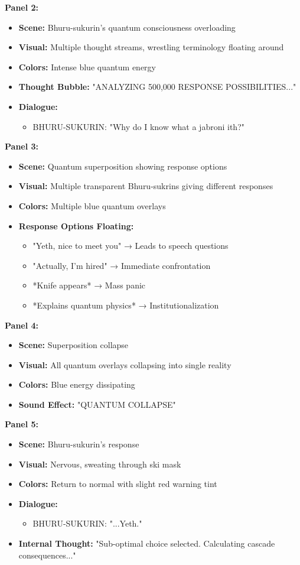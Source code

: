 \documentclass[12pt,a4paper]{article}
\begin{document}
\textbf{Panel 2:}
\begin{itemize}
\item \textbf{Scene:} Bhuru-sukurin's quantum consciousness overloading
\item \textbf{Visual:} Multiple thought streams, wrestling terminology floating around
\item \textbf{Colors:} Intense blue quantum energy
\item \textbf{Thought Bubble:} "ANALYZING 500,000 RESPONSE POSSIBILITIES..."
\item \textbf{Dialogue:}
\begin{itemize}
\item BHURU-SUKURIN: "Why do I know what a jabroni ith?"
\end{itemize}
\end{itemize}

\textbf{Panel 3:}
\begin{itemize}
\item \textbf{Scene:} Quantum superposition showing response options
\item \textbf{Visual:} Multiple transparent Bhuru-sukrins giving different responses
\item \textbf{Colors:} Multiple blue quantum overlays
\item \textbf{Response Options Floating:}
\begin{itemize}
\item "Yeth, nice to meet you" → Leads to speech questions
\item "Actually, I'm hired" → Immediate confrontation
\item *Knife appears* → Mass panic
\item *Explains quantum physics* → Institutionalization
\end{itemize}
\end{itemize}

\textbf{Panel 4:}
\begin{itemize}
\item \textbf{Scene:} Superposition collapse
\item \textbf{Visual:} All quantum overlays collapsing into single reality
\item \textbf{Colors:} Blue energy dissipating
\item \textbf{Sound Effect:} "QUANTUM COLLAPSE"
\end{itemize}

\textbf{Panel 5:}
\begin{itemize}
\item \textbf{Scene:} Bhuru-sukurin's response
\item \textbf{Visual:} Nervous, sweating through ski mask
\item \textbf{Colors:} Return to normal with slight red warning tint
\item \textbf{Dialogue:}
\begin{itemize}
\item BHURU-SUKURIN: "...Yeth."
\end{itemize}
\item \textbf{Internal Thought:} "Sub-optimal choice selected. Calculating cascade consequences..."
\end{itemize}
\end{document}
